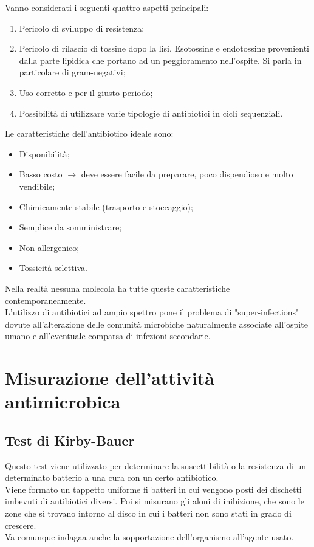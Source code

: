 Vanno considerati i seguenti quattro aspetti principali:
\begin{enumerate}
    \item Pericolo di sviluppo di resistenza;
    \item Pericolo di rilascio di tossine dopo la lisi. Esotossine e endotossine provenienti dalla parte lipidica che portano ad un peggioramento nell'ospite. Si parla in particolare di gram-negativi;
    \item Uso corretto e per il giusto periodo;
    \item Possibilità di utilizzare varie tipologie di antibiotici in cicli sequenziali.
\end{enumerate}
Le caratteristiche dell'antibiotico ideale sono:
\begin{itemize}
    \item Disponibilità;
    \item Basso costo $\xrightarrow{}$ deve essere facile da preparare, poco dispendioso e molto vendibile;
    \item Chimicamente stabile (trasporto e stoccaggio);
    \item Semplice da somministrare;
    \item Non allergenico;
    \item Tossicità selettiva.
\end{itemize}
Nella realtà nessuna molecola ha tutte queste caratteristiche contemporaneamente.
\\L'utilizzo di antibiotici ad ampio spettro pone il problema di "super-infections" dovute all'alterazione delle comunità microbiche naturalmente associate all'ospite umano e all'eventuale comparsa di infezioni secondarie. 
\section{Misurazione dell'attività antimicrobica}
\subsection{Test di Kirby-Bauer}
Questo test viene utilizzato per determinare la suscettibilità o la resistenza di un determinato batterio a una cura con un certo antibiotico. 
\\Viene formato un tappetto uniforme fi batteri in cui vengono posti dei dischetti imbevuti di antibiotici diversi. Poi si misurano gli aloni di inibizione, che sono le zone che si trovano intorno al disco in cui i batteri non sono stati in grado di crescere. 
\\Va comunque indagaa anche la sopportazione dell'organismo all'agente usato.
